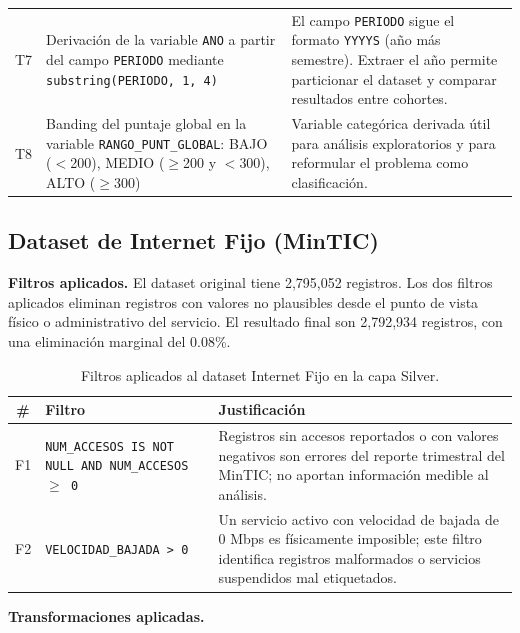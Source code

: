 \begin{table}[H]
\begin{tabularx}{\textwidth}{c l X}
T7 & Derivación de la variable \texttt{ANO} a partir del campo \texttt{PERIODO} mediante \texttt{substring(PERIODO, 1, 4)} & El campo \texttt{PERIODO} sigue el formato \texttt{YYYYS} (año más semestre). Extraer el año permite particionar el dataset y comparar resultados entre cohortes. \\
T8 & Banding del puntaje global en la variable \texttt{RANGO\_PUNT\_GLOBAL}: BAJO ($<$200), MEDIO ($\geq$200 y $<$300), ALTO ($\geq$300) & Variable categórica derivada útil para análisis exploratorios y para reformular el problema como clasificación. \\
\bottomrule
\end{tabularx}
\end{table}

\subsection{Dataset de Internet Fijo (MinTIC)}

\textbf{Filtros aplicados.} El dataset original tiene 2,795,052 registros. Los dos filtros aplicados eliminan registros con valores no plausibles desde el punto de vista físico o administrativo del servicio. El resultado final son 2,792,934 registros, con una eliminación marginal del 0.08\%.

\begin{table}[H]
\centering
\caption{Filtros aplicados al dataset Internet Fijo en la capa Silver.}
\begin{tabularx}{\textwidth}{c l X}
\toprule
\textbf{\#} & \textbf{Filtro} & \textbf{Justificación} \\
\midrule
F1 & \texttt{NUM\_ACCESOS IS NOT NULL AND NUM\_ACCESOS $\geq$ 0} & Registros sin accesos reportados o con valores negativos son errores del reporte trimestral del MinTIC; no aportan información medible al análisis. \\
F2 & \texttt{VELOCIDAD\_BAJADA > 0} & Un servicio activo con velocidad de bajada de 0 Mbps es físicamente imposible; este filtro identifica registros malformados o servicios suspendidos mal etiquetados. \\
\bottomrule
\end{tabularx}
\end{table}

\textbf{Transformaciones aplicadas.}


